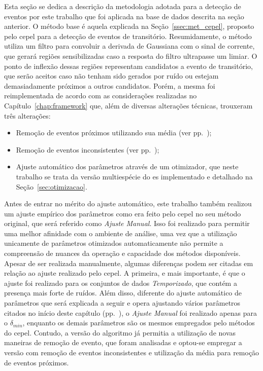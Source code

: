 Esta seção se dedica a descrição da metodologia adotada para a
detecção de eventos por este trabalho que foi aplicada na base de
dados descrita na seção anterior. O método base é aquela
explicada na Seção~\ref{ssec:met_cepel}, proposto pelo \acs{cepel}
para a detecção de eventos de transitório. Resumidamente, o
método utiliza um filtro para convoluir a derivada de Gaussiana
com o sinal de corrente, que gerará regiões sensibilizadas caso a
resposta do filtro ultrapasse um limiar. O ponto de inflexão dessas
regiões representam candidatos a evento de transitório, que serão
aceitos caso não tenham sido gerados por ruído ou estejam
demasiadamente próximos a outros candidatos. Porém, a mesma foi
reimplementada de acordo com as considerações realizadas no
Capítulo~\ref{chap:framework} que, além de diversas alterações
técnicas, trouxeram três alterações:

\begin{itemize}
\item Remoção de eventos próximos utilizando sua média (ver
pp.~\pageref{text:media});
\item Remoção de eventos inconsistentes (ver
pp.~\pageref{text:incosistentes});
\item Ajuste automático dos parâmetros através de um otimizador, que
neste trabalho se trata da versão multiespécie do \acs{es}
implementado e detalhado na Seção~\ref{sec:otimizacao}.
\end{itemize}

Antes de entrar no mérito do ajuste automático, este trabalho também
realizou um ajuste empírico dos parâmetros como era feito pelo
\acs{cepel} no seu método original, que será referido como
\emph{Ajuste Manual}. Isso foi realizado para permitir uma melhor
afinidade com o ambiente de análise, uma vez que a utilização
unicamente de parâmetros otimizados automaticamente não permite a
compreensão de nuances da operação e capacidade dos métodos disponíveis. Apesar
de ser realizada manualmente, algumas diferenças podem ser citadas em
relação ao ajuste realizado pelo \acs{cepel}. A primeira, e mais
importante, é que o ajuste foi realizado para os conjuntos de dados
\emph{Temporizado}, que contém a presença mais forte de ruídos.  Além
disso, diferente do ajuste automático de parâmetros que será explicada
a seguir e opera ajustando vários parâmetros citados no início deste
capítulo (pp.~\pageref{item:parametros}), o \emph{Ajuste Manual} foi
realizado apenas para o $\delta_{min}$, enquanto os demais parâmetros
são os mesmos empregados pelo métodos do \acs{cepel}. Contudo, a
versão do algoritmo já permitia a utilização de novas maneiras de
remoção de evento, que foram analisadas e optou-se empregar a versão
com remoção de eventos inconsistentes e utilização da média para
remoção de eventos próximos.


